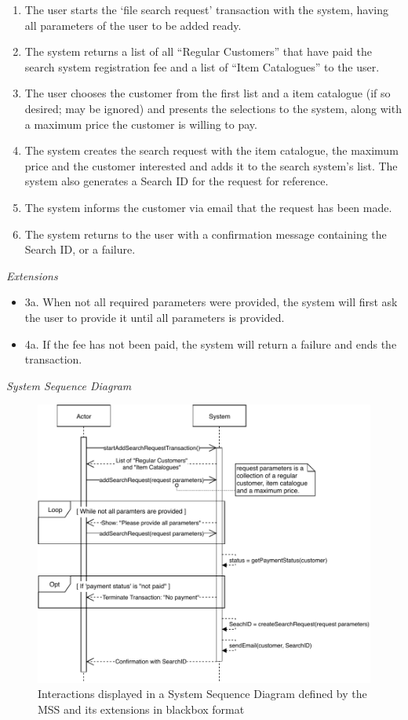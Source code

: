 \begin{enumerate}[noitemsep]
	\item The user starts the `file search request' transaction with the system, having all parameters of the user to be added ready.
	\item The system returns a list of all ``Regular Customers'' that have paid the search system registration fee and a list of ``Item Catalogues'' to the user.
	\item The user chooses the customer from the first list and a item catalogue (if so desired; may be ignored) and presents the selections to the system, along with a maximum price the customer is willing to pay.
	\item The system creates the search request with the item catalogue, the maximum price and the customer interested and adds it to the search system's list. The system also generates a Search ID for the request for reference.
	\item The system informs the customer via email that the request has been made.
	\item The system returns to the user with a confirmation message containing the Search ID, or a failure.
\end{enumerate}
\textsl{Extensions}
\begin{itemize}[noitemsep]
	\item 3a. When not all required parameters were provided, the system will first ask the user to provide it until all parameters is provided.
	\item 4a. If the fee has not been paid, the system will return a failure and ends the transaction.
\end{itemize}
\newpage
\textsl{System Sequence Diagram}
\begin{figure}[H]
	\centering
	\includegraphics[scale=1]{uml/SD-bb-createsearch.pdf}
	\caption*{Interactions displayed in a System Sequence Diagram defined by the MSS and its extensions in blackbox format}
\end{figure}
